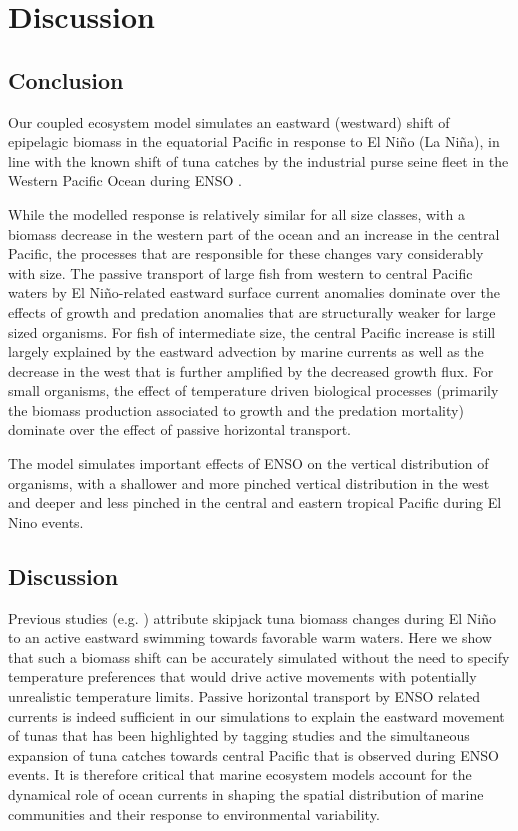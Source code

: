 \section{Discussion}


\subsection{Conclusion}

Our coupled ecosystem model simulates an eastward (westward) shift of epipelagic biomass in the equatorial Pacific in response to El Niño (La Niña), in line with the known shift of tuna catches by the industrial purse seine fleet in the Western Pacific Ocean during ENSO \citep{lehodeyNinoSouthernOscillation1997}.

While the modelled response is relatively similar for all size classes, with a biomass decrease in the western part of the ocean and an increase in the central Pacific, the processes that are responsible for these changes vary considerably with size. The passive transport of large fish from western to central Pacific waters by El Niño-related eastward surface current anomalies dominate over the effects of growth and predation anomalies that are structurally weaker for large sized organisms. For fish of intermediate size, the central Pacific increase is still largely explained by the eastward advection by marine currents as well as the decrease in the west that is further amplified by the decreased growth flux. For small organisms, the effect of temperature driven biological processes (primarily the biomass production associated to growth and the predation mortality) dominate over the effect of passive horizontal transport.

The model simulates important effects of ENSO on the vertical distribution of organisms, with a shallower and more pinched vertical distribution in the west and deeper and less pinched in the central and eastern tropical Pacific during El Nino events.

\subsection{Discussion}

Previous studies (e.g. \citealp{lehodeyNinoSouthernOscillation1997, lehodeyPelagicEcosystemTropical2001}) attribute skipjack tuna biomass changes during El Niño to an active eastward swimming towards favorable warm waters. Here we show that such a biomass shift can be accurately simulated without the need to specify temperature preferences that would drive active movements with potentially unrealistic temperature limits. Passive horizontal transport by ENSO related currents is indeed sufficient in our simulations to explain the eastward movement of tunas that has been highlighted by tagging studies and the simultaneous expansion of tuna catches towards central Pacific that is observed during ENSO events. It is therefore critical that marine ecosystem models account for the dynamical role of ocean currents in shaping the spatial distribution of marine communities and their response to environmental variability.

